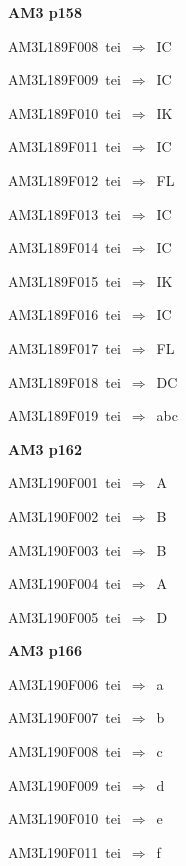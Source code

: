 \par\vfill\eject
{\bf\hfill AM3 p158\hfill\hbox{}}\par\bigskip
{\sixrm AM3L189F008\ {\sixit tei}\ }$\Rightarrow$\ IC\par\smallskip
{\sixrm AM3L189F009\ {\sixit tei}\ }$\Rightarrow$\ IC\par\smallskip
{\sixrm AM3L189F010\ {\sixit tei}\ }$\Rightarrow$\ IK\par\smallskip
{\sixrm AM3L189F011\ {\sixit tei}\ }$\Rightarrow$\ IC\par\smallskip
{\sixrm AM3L189F012\ {\sixit tei}\ }$\Rightarrow$\ FL\par\smallskip
{\sixrm AM3L189F013\ {\sixit tei}\ }$\Rightarrow$\ IC\par\smallskip
{\sixrm AM3L189F014\ {\sixit tei}\ }$\Rightarrow$\ IC\par\smallskip
{\sixrm AM3L189F015\ {\sixit tei}\ }$\Rightarrow$\ IK\par\smallskip
{\sixrm AM3L189F016\ {\sixit tei}\ }$\Rightarrow$\ IC\par\smallskip
{\sixrm AM3L189F017\ {\sixit tei}\ }$\Rightarrow$\ FL\par\smallskip
{\sixrm AM3L189F018\ {\sixit tei}\ }$\Rightarrow$\ DC\par\smallskip
{\sixrm AM3L189F019\ {\sixit tei}\ }$\Rightarrow$\ {\tenit abc}\par\smallskip

\par\vfill\eject
{\bf\hfill AM3 p162\hfill\hbox{}}\par\bigskip
{\sixrm AM3L190F001\ {\sixit tei}\ }$\Rightarrow$\ A\par\smallskip
{\sixrm AM3L190F002\ {\sixit tei}\ }$\Rightarrow$\ B\par\smallskip
{\sixrm AM3L190F003\ {\sixit tei}\ }$\Rightarrow$\ B\par\smallskip
{\sixrm AM3L190F004\ {\sixit tei}\ }$\Rightarrow$\ A\par\smallskip
{\sixrm AM3L190F005\ {\sixit tei}\ }$\Rightarrow$\ D\par\smallskip

\par\vfill\eject
{\bf\hfill AM3 p166\hfill\hbox{}}\par\bigskip
{\sixrm AM3L190F006\ {\sixit tei}\ }$\Rightarrow$\ {\tenit a}\par\smallskip
{\sixrm AM3L190F007\ {\sixit tei}\ }$\Rightarrow$\ {\tenit b}\par\smallskip
{\sixrm AM3L190F008\ {\sixit tei}\ }$\Rightarrow$\ {\tenit c}\par\smallskip
{\sixrm AM3L190F009\ {\sixit tei}\ }$\Rightarrow$\ {\tenit d}\par\smallskip
{\sixrm AM3L190F010\ {\sixit tei}\ }$\Rightarrow$\ {\tenit e}\par\smallskip
{\sixrm AM3L190F011\ {\sixit tei}\ }$\Rightarrow$\ {\tenit f}\par\smallskip


